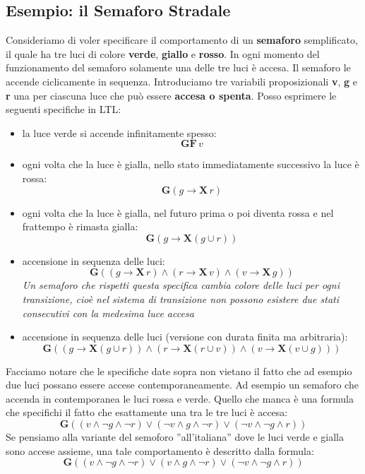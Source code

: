 \documentclass[a4paper,12pt, oneside]{book}
\begin{document}
\subsection{Esempio: il Semaforo Stradale}
Consideriamo di voler specificare il comportamento di un \textbf{semaforo}
semplificato, il quale ha tre luci di colore \textbf{verde}, \textbf{giallo} e
\textbf{rosso}. In ogni momento del funzionamento del semaforo solamente una
delle tre luci è accesa. Il semaforo le accende ciclicamente in
sequenza. Introduciamo tre variabili proposizionali \textbf{v},
\textbf{g} e \textbf{r} una  per ciascuna luce che può essere
\textbf{accesa o spenta}. Posso esprimere le seguenti specifiche in LTL:
\begin{itemize}
  \item la luce verde si accende infinitamente spesso:
  \[\mathbf{GF}\,v\]
  \item ogni volta che la luce è gialla, nello stato immediatamente successivo
  la luce è rossa:
  \[\mathbf{G}(g\rightarrow\mathbf{X}\,r)\]
  \item ogni volta che la luce è gialla, nel futuro prima o poi diventa rossa e
  nel frattempo è rimasta gialla:
  \[\mathbf{G}(g\rightarrow\mathbf{X}(g\cup r))\]
  \item accensione in sequenza delle luci:
  \[\mathbf{G}((g\rightarrow\mathbf{X}\,r)\land(r\rightarrow\mathbf{X}\,v)
    \land(v\rightarrow\mathbf{X}\,g))\]
  \textit{Un semaforo che rispetti questa specifica cambia colore delle luci per
    ogni transizione, cioè nel sistema di transizione non possono 
    esistere due stati consecutivi con la medesima luce accesa}
  \item accensione in sequenza delle luci (versione con durata finita ma
  arbitraria):
  \[\mathbf{G}((g\rightarrow\mathbf{X}(g\cup r))\land
    (r\rightarrow\mathbf{X}(r\cup v))\land(v\rightarrow\mathbf{X}(v\cup g)))\]
\end{itemize}
Facciamo notare che le specifiche date sopra non vietano il fatto che ad esempio
due luci possano essere accese contemporaneamente. Ad esempio un semaforo che
accenda in contemporanea le luci rossa e verde. Quello che manca è una formula
che specifichi il fatto che esattamente una tra le tre luci è accesa:
\[\mathbf{G}((v\land \neg g\land\neg r)\lor(\neg v\land g\land \neg r)\lor(\neg
  v\land \neg g\land r))\]
Se pensiamo alla variante del semoforo ”all’italiana” dove le luci verde e gialla sono accese assieme, una tale
comportamento è descritto dalla formula:
\[\mathbf{G}((v\land \neg g\land\neg r)\lor(v\land g\land \neg r)\lor(\neg
  v\land \neg g\land r))\]
\end{document}
